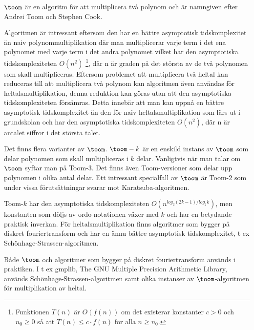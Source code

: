 $\toom$ är en algoritm för att multiplicera två polynom och är namngiven efter
Andrei Toom och Stephen Cook.

Algoritmen är intressant eftersom den har en bättre asymptotisk tidskomplexitet
än naiv polynommultiplikation där man multiplicerar varje term i det ena
polynomet med varje term i det andra polynomet vilket har den asymptotiska
tidskomplexiteten $O\left(n^2\right)$ \footnote{Funktionen $T(n)$ är $O(f(n))$
om det existerar konstanter $c > 0$ och $n_0 \geq 0$ så att $T(n) \leq c \cdot
f(n)$ för alla $n \geq n_0$.}, där n är graden på det största av de två
polynomen som skall multipliceras. Eftersom problemet att multiplicera två
heltal kan reduceras till att multiplicera två polynom kan algoritmen även
användas för heltalsmultiplikation, denna reduktion kan göras utan att den
asymptotiska tidskomplexiteten försämras. Detta innebär att man kan uppnå en
bättre asymptotisk tidskomplexitet än den för naiv heltalsmultiplikation som
lärs ut i grundskolan och har den asymptotiska tidskomplexiteten
$O\left(n^2\right)$, där n är antalet siffror i det största talet.

Det finns flera varianter av $\toom$. $\toom - k$ är en enskild instans av
$\toom$ som delar polynomen som skall multipliceras i $k$ delar. Vanligtvis när
man talar om $\toom$ syftar man på Toom-3. Det finns även Toom-versioner som
delar upp polynomen i olika antal delar. Ett intressant specialfall av $\toom$
är Toom-2 som under vissa förutsättningar svarar mot Karatsuba-algoritmen.

Toom-$k$ har den asymptotiska tidskomplexiteten $O(n^{log_2(2 k-1)/log_2 k})$,
men konstanten som döljs av ordo-notationen växer med $k$ och har en betydande
praktisk inverkan. För heltalsmultiplikation finns algoritmer som bygger på
diskret fouriertransform och har en ännu bättre asymptotisk tidskomplexitet, t
ex Schönhage-Strassen-algoritmen.

Både $\toom$ och algoritmer som bygger på diskret fouriertransform används i
praktiken. I t ex gmplib, The GNU Multiple Precision Arithmetic Library,
används Schönhage-Strassen-algoritmen samt olika instanser av
$\toom$-algoritmen för multiplikation av heltal.
